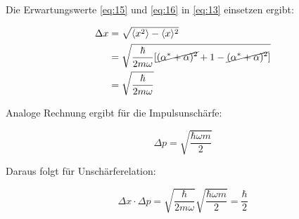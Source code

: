 Die Erwartungswerte \eqref{eq:15} und \eqref{eq:16} in \eqref{eq:13} einsetzen ergibt:

\begin{align}
  \label{eq:17}
  \Delta x &= \sqrt{ \langle x^2\rangle -\langle x\rangle^2 }\\
 &=\sqrt{\frac{\hbar}{2m\omega}[\cancel{( \alpha^*+\alpha)^2} + 1 - \cancel{ (\alpha^* + \alpha)^2}  ]}\\
 &=\sqrt{\frac{\hbar}{2m\omega}}
\end{align}

Analoge Rechnung ergibt für die Impulsunschärfe:

\begin{equation}
  \label{eq:18}
  \Delta p = \sqrt{\frac{\hbar \omega m}{2}}
\end{equation}

Daraus folgt für Unschärferelation:

\begin{equation}
  \label{eq:19}
  \Delta x\cdot\Delta p = \sqrt{\frac{\hbar}{2m\omega}} \sqrt{\frac{\hbar \omega m}{2}} = \frac{\hbar}{2}
\end{equation}



